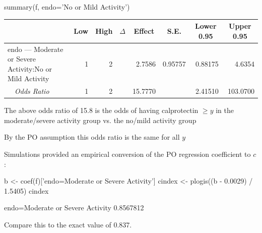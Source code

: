 {\smaller[2]
\begin{Sinput}
summary(f, endo='No or Mild Activity')
\end{Sinput}
\begin{center}
\begin{tabular}{lrrrrrrr}
\hline\hline
\multicolumn{1}{l}{}&\multicolumn{1}{c}{Low}&\multicolumn{1}{c}{High}&\multicolumn{1}{c}{$\Delta$}&\multicolumn{1}{c}{Effect}&\multicolumn{1}{c}{S.E.}&\multicolumn{1}{c}{Lower 0.95}&\multicolumn{1}{c}{Upper 0.95}\tabularnewline
\hline
endo --- Moderate or Severe Activity:No or Mild Activity&1&2&& 2.7586&0.95757&0.88175&  4.6354\tabularnewline
~~{\it Odds Ratio}&1&2&&15.7770&&2.41510&103.0700\tabularnewline
\hline
\end{tabular}\end{center}

}
\item The above odds ratio of 15.8 is the odds of having calprotectin $\geq y$ in the moderate/severe activity group vs. the no/mild activity group
 \bi
 \item By the PO assumption this odds ratio is the same for all $y$
 \ei
\item Simulations provided an empirical conversion of the PO regression coefficient to $c$:
\begin{Schunk}
\begin{Sinput}
b <- coef(f)['endo=Moderate or Severe Activity']
cindex <- plogis((b - 0.0029) / 1.5405)
cindex
\end{Sinput}
\begin{Soutput}
endo=Moderate or Severe Activity 
                       0.8567812 
\end{Soutput}
\end{Schunk}

Compare this to the exact value of 0.837.

